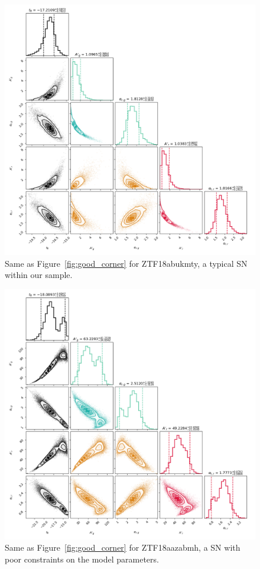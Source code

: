 \documentclass[twocolumn]{aastex63}
\begin{document}
\begin{figure}
    \centering
    \includegraphics[width=1\linewidth]{./figures/ZTF18abukmty_corner.png}
    \caption{Same as Figure~\ref{fig:good_corner} for ZTF18abukmty, a typical
    SN within our sample.}
    \label{fig:median_corner}
\end{figure}

\begin{figure}
    \centering
    \includegraphics[width=1\linewidth]{./figures/ZTF18aazabmh_corner.png}
    \caption{Same as Figure~\ref{fig:good_corner} for ZTF18aazabmh, a SN with
    poor constraints on the model parameters.}
    \label{fig:bad_corner}
\end{figure}
\end{document}
